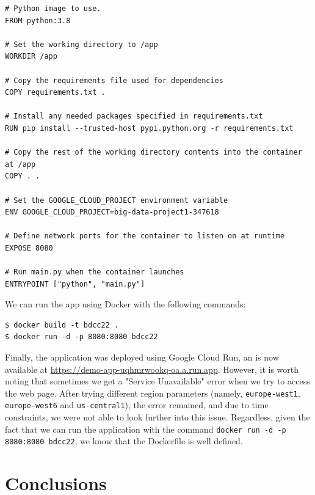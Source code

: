 \documentclass[a4paper, 11pt]{article}
\newenvironment{code}{\captionsetup{type=listing}}{}
\begin{document}
\begin{code}
\begin{verbatim}
# Python image to use.
FROM python:3.8

# Set the working directory to /app
WORKDIR /app

# Copy the requirements file used for dependencies
COPY requirements.txt .

# Install any needed packages specified in requirements.txt
RUN pip install --trusted-host pypi.python.org -r requirements.txt

# Copy the rest of the working directory contents into the container at /app
COPY . .

# Set the GOOGLE_CLOUD_PROJECT environment variable
ENV GOOGLE_CLOUD_PROJECT=big-data-project1-347618

# Define network ports for the container to listen on at runtime
EXPOSE 8080

# Run main.py when the container launches
ENTRYPOINT ["python", "main.py"]
\end{verbatim}
\label{code:dockerfile}
\end{code}

\vspace{\baselineskip}

We can run the app using Docker with the following commands:

\begin{verbatim}
$ docker build -t bdcc22 .
$ docker run -d -p 8080:8080 bdcc22
\end{verbatim}

Finally, the application was deployed using Google Cloud Run, an is now available at 
\url{https://demo-app-uqhmrwookq-oa.a.run.app}. However, it is worth noting that sometimes we get a 
"Service Unavailable" error when we try to access the web page. After trying different region 
parameters (namely, \texttt{europe-west1}, \texttt{europe-west6} and \texttt{us-central1}), the 
error remained, and due to time constraints, we were not able to look further into this issue. 
Regardless, given the fact that we can run the application with the command \texttt{docker run -d 
-p 8080:8080 bdcc22}, we know that the Dockerfile is well defined.

\pagebreak

\section{Conclusions} \label{sec:conclusion}
\end{document}
